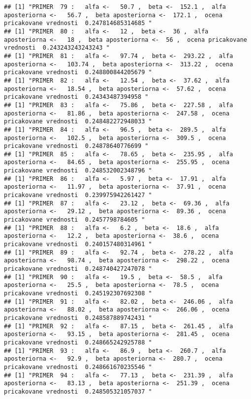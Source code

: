 \documentclass[
]{article}
\begin{document}
\begin{verbatim}
## [1] "PRIMER  79 :   alfa <-   50.7 ,  beta <-  152.1 ,  alfa aposteriorna <-   56.7 ,  beta aposteriorna <-  172.1 ,  ocena pricakovane vrednosti  0.247814685314685 "
## [1] "PRIMER  80 :   alfa <-   12 ,  beta <-  36 ,  alfa aposteriorna <-   18 ,  beta aposteriorna <-  56 ,  ocena pricakovane vrednosti  0.243243243243243 "
## [1] "PRIMER  81 :   alfa <-   97.74 ,  beta <-  293.22 ,  alfa aposteriorna <-   103.74 ,  beta aposteriorna <-  313.22 ,  ocena pricakovane vrednosti  0.248800844205679 "
## [1] "PRIMER  82 :   alfa <-   12.54 ,  beta <-  37.62 ,  alfa aposteriorna <-   18.54 ,  beta aposteriorna <-  57.62 ,  ocena pricakovane vrednosti  0.24343487394958 "
## [1] "PRIMER  83 :   alfa <-   75.86 ,  beta <-  227.58 ,  alfa aposteriorna <-   81.86 ,  beta aposteriorna <-  247.58 ,  ocena pricakovane vrednosti  0.248482272948033 "
## [1] "PRIMER  84 :   alfa <-   96.5 ,  beta <-  289.5 ,  alfa aposteriorna <-   102.5 ,  beta aposteriorna <-  309.5 ,  ocena pricakovane vrednosti  0.24878640776699 "
## [1] "PRIMER  85 :   alfa <-   78.65 ,  beta <-  235.95 ,  alfa aposteriorna <-   84.65 ,  beta aposteriorna <-  255.95 ,  ocena pricakovane vrednosti  0.248532002348796 "
## [1] "PRIMER  86 :   alfa <-   5.97 ,  beta <-  17.91 ,  alfa aposteriorna <-   11.97 ,  beta aposteriorna <-  37.91 ,  ocena pricakovane vrednosti  0.239975942261427 "
## [1] "PRIMER  87 :   alfa <-   23.12 ,  beta <-  69.36 ,  alfa aposteriorna <-   29.12 ,  beta aposteriorna <-  89.36 ,  ocena pricakovane vrednosti  0.2457798784605 "
## [1] "PRIMER  88 :   alfa <-   6.2 ,  beta <-  18.6 ,  alfa aposteriorna <-   12.2 ,  beta aposteriorna <-  38.6 ,  ocena pricakovane vrednosti  0.240157480314961 "
## [1] "PRIMER  89 :   alfa <-   92.74 ,  beta <-  278.22 ,  alfa aposteriorna <-   98.74 ,  beta aposteriorna <-  298.22 ,  ocena pricakovane vrednosti  0.248740427247078 "
## [1] "PRIMER  90 :   alfa <-   19.5 ,  beta <-  58.5 ,  alfa aposteriorna <-   25.5 ,  beta aposteriorna <-  78.5 ,  ocena pricakovane vrednosti  0.245192307692308 "
## [1] "PRIMER  91 :   alfa <-   82.02 ,  beta <-  246.06 ,  alfa aposteriorna <-   88.02 ,  beta aposteriorna <-  266.06 ,  ocena pricakovane vrednosti  0.248587889742431 "
## [1] "PRIMER  92 :   alfa <-   87.15 ,  beta <-  261.45 ,  alfa aposteriorna <-   93.15 ,  beta aposteriorna <-  281.45 ,  ocena pricakovane vrednosti  0.248665242925788 "
## [1] "PRIMER  93 :   alfa <-   86.9 ,  beta <-  260.7 ,  alfa aposteriorna <-   92.9 ,  beta aposteriorna <-  280.7 ,  ocena pricakovane vrednosti  0.248661670235546 "
## [1] "PRIMER  94 :   alfa <-   77.13 ,  beta <-  231.39 ,  alfa aposteriorna <-   83.13 ,  beta aposteriorna <-  251.39 ,  ocena pricakovane vrednosti  0.248505321057037 "

\end{verbatim}
\end{document}
